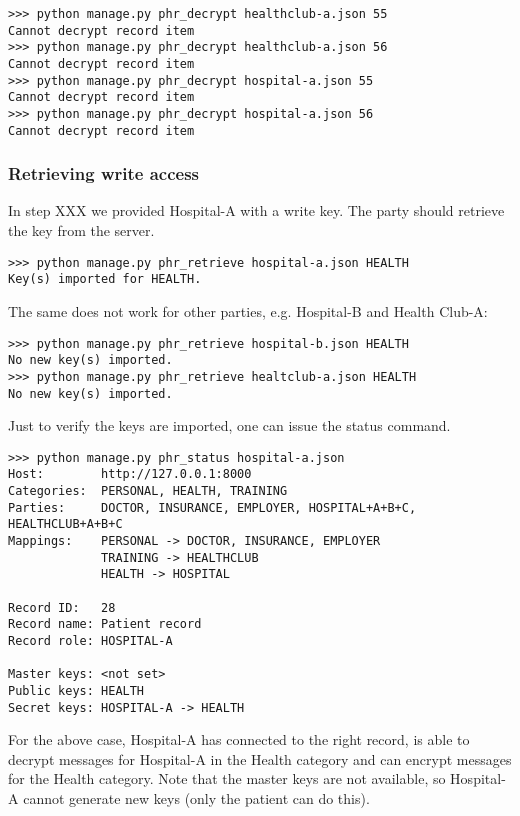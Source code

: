 \documentclass[a4paper]{article}
\begin{document}
			\begin{lstlisting}
>>> python manage.py phr_decrypt healthclub-a.json 55
Cannot decrypt record item
>>> python manage.py phr_decrypt healthclub-a.json 56
Cannot decrypt record item
>>> python manage.py phr_decrypt hospital-a.json 55
Cannot decrypt record item
>>> python manage.py phr_decrypt hospital-a.json 56
Cannot decrypt record item
			\end{lstlisting}
		
		\subsubsection{Retrieving write access}\label{sec:usecase_6}
			In step XXX we provided Hospital-A with a write key. The party should retrieve the key from the server.
			
			\begin{lstlisting}
>>> python manage.py phr_retrieve hospital-a.json HEALTH
Key(s) imported for HEALTH.
			\end{lstlisting}
			
			The same does not work for other parties, e.g. Hospital-B and Health Club-A:
		
			\begin{lstlisting}
>>> python manage.py phr_retrieve hospital-b.json HEALTH
No new key(s) imported.
>>> python manage.py phr_retrieve healtclub-a.json HEALTH
No new key(s) imported.
			\end{lstlisting}
		
			Just to verify the keys are imported, one can issue the status command.
			
			\begin{lstlisting}
>>> python manage.py phr_status hospital-a.json
Host:        http://127.0.0.1:8000
Categories:  PERSONAL, HEALTH, TRAINING
Parties:     DOCTOR, INSURANCE, EMPLOYER, HOSPITAL+A+B+C, HEALTHCLUB+A+B+C
Mappings:    PERSONAL -> DOCTOR, INSURANCE, EMPLOYER
             TRAINING -> HEALTHCLUB
             HEALTH -> HOSPITAL

Record ID:   28
Record name: Patient record
Record role: HOSPITAL-A

Master keys: <not set>
Public keys: HEALTH
Secret keys: HOSPITAL-A -> HEALTH
			\end{lstlisting}
			
			For the above case, Hospital-A has connected to the right record, is able to decrypt messages for Hospital-A in the Health category and can encrypt messages for the Health category. Note that the master keys are not available, so Hospital-A cannot generate new keys (only the patient can do this).
		
\end{document}

